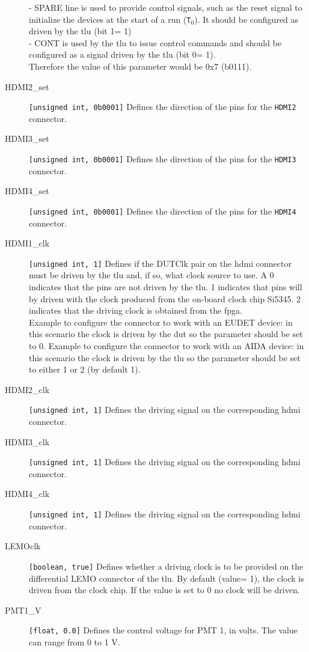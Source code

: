 \begin{description}
  - SPARE line is used to provide control signals, such as the reset signal to initialize the devices at the start of a run (\texttt{T$_0$}). It should be configured as driven by the \gls{tlu} (bit 1= 1)\\
  - CONT is used by the \gls{tlu} to issue control commands and should be configured as a signal driven by the \gls{tlu} (bit 0= 1).\\
  Therefore the value of this parameter would be 0x7 (b0111).
  \item[HDMI2\_set] \verb|[unsigned int, 0b0001]| Defines the direction of the pins for the \verb|HDMI2| connector.
  \item[HDMI3\_set] \verb|[unsigned int, 0b0001]| Defines the direction of the pins for the \verb|HDMI3| connector.
  \item[HDMI4\_set] \verb|[unsigned int, 0b0001]| Defines the direction of the pins for the \verb|HDMI4| connector.
  \item[HDMI1\_clk] \verb|[unsigned int, 1]| Defines if the DUTClk pair on the \gls{hdmi} connector must be driven by the \gls{tlu} and, if so, what clock source to use. A 0 indicates that the pins are not driven by the \gls{tlu}. 1 indicates that pins will by driven with the clock produced from the on-board clock chip Si5345. 2 indicates that the driving clock is obtained from the \gls{fpga}.\\
      Example to configure the connector to work with an EUDET device: in this scenario the clock is driven by the \gls{dut} so the parameter should be set to 0.
      Example to configure the connector to work with an AIDA device: in this scenario the clock is driven by the \gls{tlu} so the parameter should be set to either 1 or 2 (by default 1).
  \item[HDMI2\_clk] \verb|[unsigned int, 1]| Defines the driving signal on the corresponding \gls{hdmi} connector.
  \item[HDMI3\_clk] \verb|[unsigned int, 1]| Defines the driving signal on the corresponding \gls{hdmi} connector.
  \item[HDMI4\_clk] \verb|[unsigned int, 1]| Defines the driving signal on the corresponding \gls{hdmi} connector.
  \item[LEMOclk] \verb|[boolean, true]| Defines whether a driving clock is to be provided on the differential LEMO connector of the \gls{tlu}. By default (value= 1), the clock is driven from the clock chip. If the value is set to 0 no clock will be driven.
  \item[PMT1\_V] \verb|[float, 0.0]| Defines the control voltage for PMT 1, in volts. The value can range from 0 to 1 V.

\end{description}
